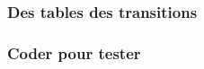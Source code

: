 \subsubsection{Des tables des transitions} \label{2-or-3}

	


\subsubsection{Coder pour tester}

	
